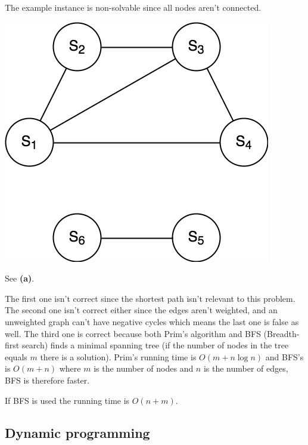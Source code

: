 \documentclass[a4paper]{article}
\newenvironment{task}[1]
{
	\begin{description}[align=right]
		\item [#1]
}{		%
	\end{description}
}
\newcommand{\taskref}[1]{\textbf{#1}}
\DeclareMathOperator{\*}{\cdot}
\begin{document}
\begin{task}{(b)}
	\qquad The example instance is non-solvable since all nodes aren't connected. 
	
	\includegraphics[scale=0.3]{130529-4b.png}
\end{task}

\begin{task}{(c)}
	 See \taskref{(a)}.
\end{task}

\begin{task}{(d)}
	 The first one isn't correct since the shortest path isn't relevant to this problem. The second one isn't correct either since the edges aren't weighted, and an unweighted graph can't have negative cycles which means the last one is false as well. The third one is correct because both Prim's algorithm and BFS (Breadth-first search) finds a minimal spanning tree (if the number of nodes in the tree equals $m$ there is a solution). Prim's running time is $O(m+n \log n)$ and BFS's is $O(m+n)$ where $m$ is the number of nodes and $n$ is the number of edges, BFS is therefore faster.
\end{task}

\begin{task}{(e)}
	 If BFS is used the running time is $O(n+m)$.
\end{task}

\subsection*{Dynamic programming}
\end{document}
